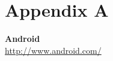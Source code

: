 \documentclass[a4paper,12pt]{book}
\begin{document}

\appendix
\chapter{Appendix A}
\label{app:appenda}

\begin{thebibliography}{25}
 


\textbf{Android}\\
{\footnotesize\url{http://www.android.com/}}


\end{thebibliography}
\end{document}
